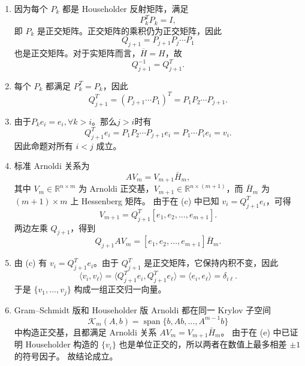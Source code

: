 \documentclass{ctexart}
\begin{document}
\begin{solution}
  \begin{enumerate}
    \item 因为每个 $P_k$ 都是 Householder 反射矩阵，满足
      \[
        P_k^T P_k = I,
      \]
      即 $P_k$ 是正交矩阵。正交矩阵的乘积仍为正交矩阵，因此
      \[
        Q_{j+1} = P_{j+1} P_j \cdots P_1
      \]
      也是正交矩阵。对于实矩阵而言，\(\overline{H}=H \)，故
      \[
        Q_{j+1}^{-1} = Q_{j+1}^T.
      \]
    \item 每个 $P_k$ 都满足 $P_k^T = P_k$，因此
      \[
        Q_{j+1}^T = (P_{j+1} \cdots P_1)^T = P_1 P_2 \cdots P_{j+1}.
      \]
    \item 由于\(P_ke_i=e_i,\forall k >i \)。那么\(j >i \)时有
      \[
        Q_{j+1}^T e_i = P_1 P_2 \cdots P_{j+1} e_i = P_1 \cdots P_i e_i = v_i.
      \]
      因此命题对所有 $i < j$ 成立。
    \item 标准 Arnoldi 关系为
      \[
        A V_m = V_{m+1} \bar{H}_m,
      \]
      其中 $V_m \in \mathbb{R}^{n \times m}$ 为 Arnoldi 正交基，$V_{m+1} \in \mathbb{R}^{n \times (m+1)}$，而 $\bar{H}_m$ 为 $(m+1) \times m$ 上 Hessenberg 矩阵。
      由于在 (c) 中已知 $v_i = Q_{j+1}^T e_i$，可得
      \[
        V_{m+1} = Q_{j+1}^T [e_1, e_2, \dots, e_{m+1}].
      \]
      两边左乘 $Q_{j+1}$，得到
      \[
        Q_{j+1} A V_m = [e_1, e_2, \dots, e_{m+1}] \bar{H}_m.
      \]
    \item 由 (c) 有 $v_i = Q_{j+1}^T e_i$。由于 $Q_{j+1}^T$ 是正交矩阵，它保持内积不变，因此
      \[
        \langle v_i, v_\ell \rangle = \langle Q_{j+1}^T e_i, Q_{j+1}^T e_\ell \rangle
        = \langle e_i, e_\ell \rangle = \delta_{i\ell}.
      \]
      于是 $\{v_1, \dots, v_j\}$ 构成一组正交归一向量。
    \item
      Gram–Schmidt 版和 Householder 版 Arnoldi 都在同一 Krylov 子空间
      \[
        \mathcal{K}_m(A, b) = \operatorname{span}\{b, Ab, \dots, A^{m-1} b\}
      \]
      中构造正交基，且都满足 Arnoldi 关系 $A V_m = V_{m+1} \bar{H}_m$。
      由于在 (e) 中已证明 Householder 构造的 $\{v_i\}$ 也是单位正交的，所以两者在数值上最多相差 $\pm 1$ 的符号因子。
      故结论成立。
  \end{enumerate}
\end{solution}
\end{document}
